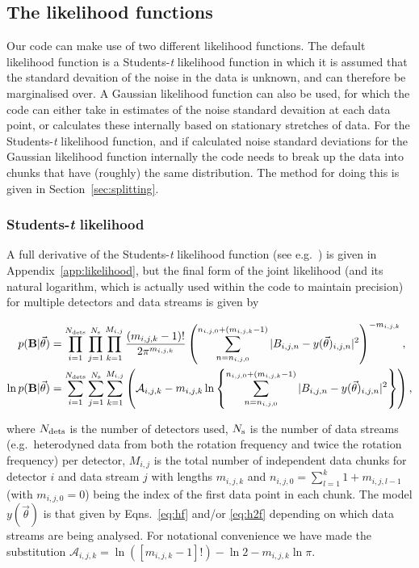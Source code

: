 \documentclass[aps,prd,showpacs,superscriptaddress,twocolumn,preprintnumbers,altaffilletter]{revtex4-1}
\begin{document}
\subsection{The likelihood functions}\label{sec:likelihood}

Our code can make use of two different likelihood functions. The default likelihood function is a
Students-{\it t} likelihood function in which it is assumed that the standard devaition of the noise in the
data is unknown, and can therefore be marginalised over. A Gaussian likelihood function can also be used, for
which the code can either take in estimates of the noise standard devaition at each data point, or calculates
these internally based on stationary stretches of data. For the Students-{\it t} likelihood function, and if
calculated noise standard deviations for the Gaussian likelihood function internally the code needs to break
up the data into chunks that have (roughly) the same distribution. The method for doing this is given in
Section~\ref{sec:splitting}.

\subsubsection{Students-{\it t} likelihood}

A full derivative of the Students-{\it t} likelihood function (see e.g.~\cite{2005PhRvD..72j2002D}) is given
in Appendix~\ref{app:likelihood}, but the final form of the joint likelihood (and its natural logarithm,
which is actually used within the code to maintain precision) for multiple detectors and data streams is
given by
\begin{widetext}
\begin{align}\label{eq:stlikelihood}
p(\mathbf{B}|\vec{\theta}) &= \prod_{i=1}^{N_{\rm dets}} \prod_{j=1}^{N_{\rm s}} \prod_{k=1}^{M_{i,j}}
\frac{(m_{i,j,k}-1)!}{2\pi^{m_{i,j,k}}}
\left(\sum_{n=n_{i,j,0}}^{n_{i,j,0}+(m_{i,j,k}-1)} |B_{i,j,n}-y(\vec{\theta})_{i,j,n}|^2\right)^{-m_{i,j,k}},
\nonumber \\
\ln{p(\mathbf{B}|\vec{\theta})} &= \sum_{i=1}^{N_{\rm dets}} \sum_{j=1}^{N_{\rm s}}
\sum_{k=1}^{M_{i,j}} \left( \mathcal{A}_{i,j,k} - m_{i,j,k}\ln{
\left\{\sum_{n=n_{i,j,0}}^{n_{i,j,0}+(m_{i,j,k}-1)} |B_{i,j,n}-y(\vec{\theta})_{i,j,n}|^2\right\}}
\right),
\end{align}
\end{widetext}
where $N_{\rm dets}$ is the number of detectors used, $N_{\rm s}$ is the number of data streams (e.g.\
heterodyned data from both the rotation frequency and twice the rotation frequency) per detector, $M_{i,j}$ is
the total number of independent data chunks for detector $i$ and data stream $j$ with lengths $m_{i,j,k}$ and
$n_{i,j,0} = \sum_{l=1}^{k} 1+m_{i,j,l-1}$ (with $m_{i,j,0} = 0$) being the index of the first data point in
each chunk. The model $y(\vec{\theta})$ is that given by Eqns.~\ref{eq:hf} and/or \ref{eq:h2f}
depending on which data streams are being analysed. For notational convenience we have made the substitution
$\mathcal{A}_{i,j,k} = \ln{\left([m_{i,j,k}-1]!\right)} - \ln{2} - m_{i,j,k}\ln{\pi}$.
\end{document}
